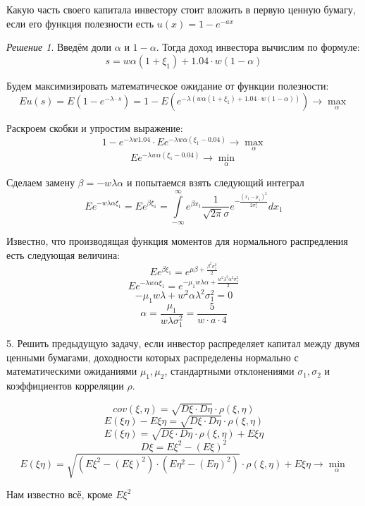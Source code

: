 \documentclass[%
12pt, %
final, %
oneside, %
onecolumn, %
centertags]{article} %
\theoremstyle{plain}
\theoremstyle{definition}
\theoremstyle{remark}
\newtheorem{solution}{Решение}
\begin{document}
Какую часть своего капитала инвестору стоит вложить в первую ценную бумагу, если его функция полезности есть $u(x) = 1 - e^{-ax}$
\begin{solution}
	Введём доли $\alpha$ и $1-\alpha$. Тогда доход инвестора вычислим по формуле:
	$$ s = w\alpha(1+\xi_1) + 1.04 \cdot w(1-\alpha)$$

	Будем максимизировать математическое ожидание от функции полезности:
	$$Eu(s) = E (1-e^{-\lambda \cdot s}) = 1 - E \left(e^{-\lambda \left(w\alpha(1+\xi_1) + 1.04 \cdot w(1-\alpha)\right)}\right) \to \underset{\alpha}{\max}$$

	Раскроем скобки и упростим выражение:
	$$1 - e^{-\lambda w 1.04} \cdot Ee^{-\lambda w \alpha (\xi_1 - 0.04)} \to \underset{\alpha}{\max}$$
	$$Ee^{-\lambda w \alpha (\xi_1 - 0.04)} \to \underset{\alpha}{\min}$$

	Сделаем замену $\beta = -w\lambda\alpha$ и попытаемся взять следующий интеграл
	$$Ee^{-w\lambda\alpha\xi_1} = Ee^{\beta \xi_1} = \int\limits_{-\infty}^{\infty} e^{\beta x_1}\frac{1}{\sqrt{2\pi}\sigma}e^{-\frac{(x_1-\mu_1)^2}{2\sigma_1^2}}dx_1$$

	Известно, что производящая функция моментов для нормального распредления есть следующая величина:
	$$Ee^{\beta \xi_1} = e^{\mu\beta + \frac{\beta^2 \sigma_1^2}{2}}$$
	$$Ee^{-\lambda w \alpha \xi_1} = e^{-\mu_1w\lambda\alpha + \frac{w^2 \lambda^2\alpha^2 \sigma_1^2}{2}}$$
	$$-\mu_1w\lambda + w^2 \alpha \lambda^2 \sigma_1^2 = 0$$
	$$\alpha = \frac{\mu_1}{w\lambda\sigma_1^2} = \frac{5}{w\cdot a \cdot 4}$$


\end{solution}

5. Решить предыдущую задачу, если инвестор распределяет капитал между двумя ценными бумагами, доходности которых распределены нормально с математическими ожиданиями $\mu_1,\mu_2$, стандартными отклонениями $\sigma_1, \sigma_2$ и коэффициентов корреляции $\rho$.

$$cov(\xi,\eta) = \sqrt{D\xi \cdot D\eta} \cdot \rho(\xi,\eta)$$
$$E(\xi\eta) - E\xi\eta = \sqrt{D\xi \cdot D\eta} \cdot \rho(\xi,\eta)$$
$$E(\xi\eta) = \sqrt{D\xi \cdot D\eta} \cdot \rho(\xi,\eta) + E\xi\eta$$
$$D\xi = E\xi^2 - (E\xi)^2$$
$$E(\xi\eta) = \sqrt{\left(E\xi^2 - (E\xi)^2\right)\cdot \left(E\eta^2 - (E\eta)^2\right)}\cdot \rho(\xi,\eta) + E\xi\eta \to \underset{\alpha}{\min}$$

Нам известно всё, кроме $E\xi^2$
\end{document}
